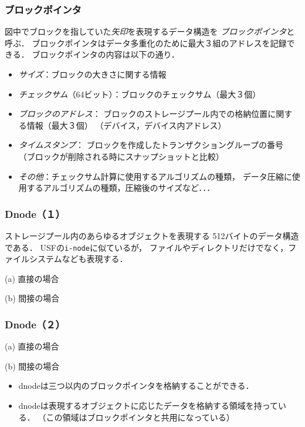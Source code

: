 \documentclass[unicode]{beamer}                   %
\begin{document}
\begin{frame}[fragile]
  \frametitle{ブロックポインタ}
  図中でブロックを指していた\emph{矢印}を表現するデータ構造を
  \emph{ブロックポインタ}と呼ぶ．
  ブロックポインタはデータ多重化のために最大３組のアドレスを記録できる．
  ブロックポインタの内容は以下の通り．
  \vfill
  \begin{itemize}
  \item \emph{サイズ}：ブロックの大きさに関する情報
  \item \emph{チェックサム}（64ビット）：ブロックのチェックサム（最大３個）
  \item \emph{ブロックのアドレス}：
    ブロックのストレージプール内での格納位置に関する情報（最大３個）
    （デバイス，デバイス内アドレス）
  \item \emph{タイムスタンプ}：
    ブロックを作成したトランザクショングループの番号
    （ブロックが削除される時にスナップショットと比較）
  \item \emph{その他}：チェックサム計算に使用するアルゴリズムの種類，
    データ圧縮に使用するアルゴリズムの種類，圧縮後のサイズなど．．．
  \end{itemize}
  \vfill
\end{frame}

\begin{frame}[fragile]
  \frametitle{Dnode（１）}
  ストレージプール内のあらゆるオブジェクトを表現する
  512バイトのデータ構造である．
  USFの\texttt{i-node}に似ているが，
  ファイルやディレクトリだけでなく，ファイルシステムなども表現する．
  \begin{minipage}{0.49\columnwidth}
    \centerline{(a) 直接の場合}
  \end{minipage}
  \begin{minipage}{0.49\columnwidth}
    \centerline{(b) 間接の場合}
  \end{minipage}
  \vfill
\end{frame}

\begin{frame}[fragile]
  \frametitle{Dnode（２）}
  \begin{minipage}{0.49\columnwidth}
    \centerline{(a) 直接の場合}
  \end{minipage}
  \begin{minipage}{0.49\columnwidth}
    \centerline{(b) 間接の場合}
  \end{minipage}
  \begin{itemize}
  \item dnodeは三つ以内のブロックポインタを格納することができる．
  \item dnodeは表現するオブジェクトに応じたデータを格納する領域を持っている．
    （この領域はブロックポインタと共用になっている）
  \end{itemize}
  \vfill
\end{frame}
\end{document}
